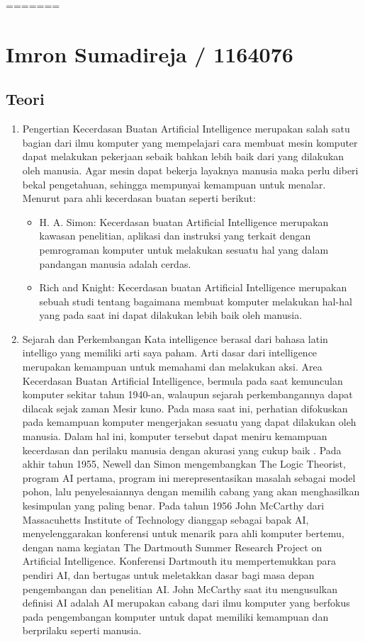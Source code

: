 =======
\section{Imron Sumadireja / 1164076}
\subsection{Teori}
\begin{enumerate}
\item
Pengertian
\subitem
Kecerdasan Buatan Artificial Intelligence merupakan salah satu bagian dari ilmu komputer yang mempelajari cara membuat mesin komputer dapat melakukan pekerjaan sebaik bahkan lebih baik dari yang dilakukan oleh manusia. Agar mesin dapat bekerja layaknya manusia maka perlu diberi bekal pengetahuan, sehingga mempunyai kemampuan untuk menalar. Menurut para ahli kecerdasan buatan seperti berikut:
\begin{itemize}
\item
H. A. Simon:
Kecerdasan buatan Artificial Intelligence merupakan kawasan penelitian, aplikasi dan instruksi yang terkait dengan pemrograman komputer untuk melakukan sesuatu hal yang dalam pandangan manusia adalah cerdas.
\item
Rich and Knight:
Kecerdasan buatan Artificial Intelligence merupakan sebuah studi tentang bagaimana membuat komputer melakukan hal-hal yang pada saat ini dapat dilakukan lebih baik oleh manusia.
\end{itemize}

\item
Sejarah dan Perkembangan
\subitem
Kata intelligence berasal dari bahasa latin intelligo yang memiliki arti saya paham. Arti dasar dari intelligence merupakan kemampuan untuk memahami dan melakukan aksi. Area Kecerdasan Buatan Artificial Intelligence, bermula pada saat kemunculan komputer sekitar tahun 1940-an, walaupun sejarah perkembangannya dapat dilacak sejak zaman Mesir kuno. Pada masa saat ini, perhatian difokuskan pada kemampuan komputer mengerjakan sesuatu yang dapat dilakukan oleh manusia. Dalam hal ini, komputer tersebut dapat meniru kemampuan kecerdasan dan perilaku manusia dengan akurasi yang cukup baik \cite{warwick2013artificial}.
\subitem
Pada akhir tahun 1955, Newell dan Simon mengembangkan The Logic Theorist, program AI pertama, program ini merepresentasikan masalah sebagai model pohon, lalu penyelesaiannya dengan memilih cabang yang akan menghasilkan kesimpulan yang paling benar. Pada tahun 1956 John McCarthy dari Massacuhetts Institute of Technology dianggap sebagai bapak AI, menyelenggarakan konferensi untuk menarik para ahli komputer bertemu, dengan nama kegiatan The Dartmouth Summer Research Project on Artificial Intelligence. Konferensi Dartmouth itu mempertemukkan para pendiri AI, dan bertugas untuk meletakkan dasar bagi masa depan pengembangan dan penelitian AI. John McCarthy saat itu mengusulkan definisi AI adalah AI merupakan cabang dari ilmu komputer yang berfokus pada pengembangan komputer untuk dapat memiliki kemampuan dan berprilaku seperti manusia\cite{bassil2012expert}.


\end{enumerate}
